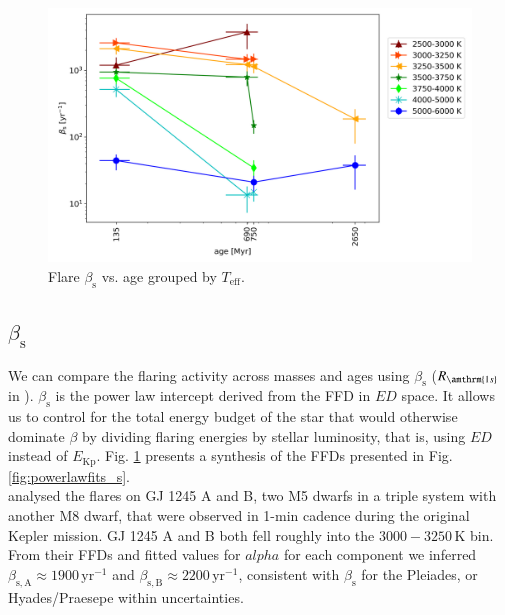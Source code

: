 \documentclass{aa}
\begin{document}
\begin{figure}
    \centering
    \includegraphics[width=13.5cm]{pics/FFDs/beta_T_age_ED_wheatland.png}
    \caption{Flare $\beta_\mathrm{s}$ vs. age grouped by $T_\mathrm{eff}$.}          	
    \label{fig:beta_T_age}
\end{figure}
\subsection{$\beta_\mathrm{s}$}
We can compare the flaring activity across masses and ages using $\beta_\mathrm{s}$ ($R_\amthrm{1s}$ in \citealt{davenport_flaresevolve_2019}). $\beta_\mathrm{s}$ is the power law intercept derived from the FFD in $ED$ space. It allows us to control for the total energy budget of the star that would otherwise dominate $\beta$ by dividing flaring energies by stellar luminosity, that is, using $ED$ instead of $E_\mathrm{Kp}$. Fig. \ref{fig:beta_T_age} presents a synthesis of the FFDs presented in Fig. \ref{fig:powerlawfits_s}. 
\\
\citet{lurie2015} analysed the flares on GJ 1245 A and B, two M5 dwarfs in a triple system with another M8 dwarf, that were observed in 1-min cadence during the original Kepler mission. GJ 1245 A and B both fell roughly into the $3000-3250\,$K bin. From their FFDs and fitted values for $alpha$ for each component we inferred $\beta_\mathrm{s,A}\approx 1900\,\mathrm{yr}^{-1}$  and $\beta_\mathrm{s,B}\approx 2200\,\mathrm{yr}^{-1}$, consistent with $\beta_\mathrm{s}$ for the Pleiades, or Hyades/Praesepe within uncertainties.
\end{document}
